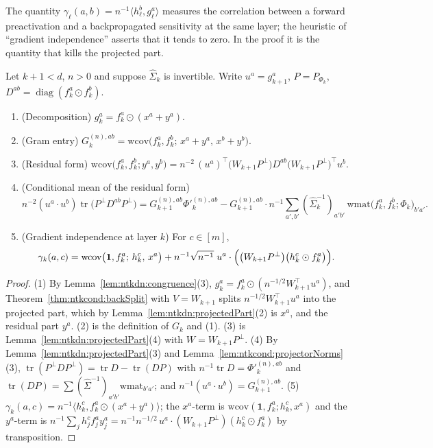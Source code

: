 The quantity $\gamma_\ell(a,b)=n^{-1}\langle h_\ell^b,g_\ell^a\rangle$ measures the correlation between a forward preactivation and a backpropagated sensitivity at the same layer; the heuristic of ``gradient independence'' asserts that it tends to zero. In the proof it is the quantity that kills the projected part.

\begin{lemma}\label{lem:ntkdn:hiddenDecomp}
  \leanok
Let $k+1<d$, $n>0$ and suppose $\hat\Sigma_k$ is invertible. Write $u^a=g_{k+1}^a$, $P=P_{\Phi_k}$, $D^{ab}=\operatorname{diag}(f_k^a\odot f_k^b)$.
\begin{enumerate}
  \item (Decomposition) $g_k^a=f_k^a\odot(x^a+y^a)$.
  \item (Gram entry) $G_k^{(n),ab}=\mathrm{wcov}\bigl(f_k^a,f_k^b;\,x^a+y^a,\,x^b+y^b\bigr)$.
  \item (Residual form) $\mathrm{wcov}\bigl(f_k^a,f_k^b;y^a,y^b\bigr)=n^{-2}\,(u^a)^\top\bigl(W_{k+1}P^\perp\bigr)D^{ab}\bigl(W_{k+1}P^\perp\bigr)^\top u^b$.
  \item (Conditional mean of the residual form)
  \[
    n^{-2}(u^a\cdot u^b)\operatorname{tr}\bigl(P^\perp D^{ab}P^\perp\bigr)=G_{k+1}^{(n),ab}\Phi'^{(n),ab}_k-G_{k+1}^{(n),ab}\cdot n^{-1}\sum_{a',b'}(\hat\Sigma_k^{-1})_{a'b'}\,\mathrm{wmat}\bigl(f_k^a,f_k^b;\Phi_k\bigr)_{b'a'} .
  \]
  \item (Gradient independence at layer $k$) For $c\in[m]$,
  \[
    \gamma_k(a,c)=\mathrm{wcov}\bigl(\mathbf 1,f_k^a;\,h_k^c,\,x^a\bigr)+n^{-1}\sqrt{n^{-1}}\;u^a\cdot\Bigl(\bigl(W_{k+1}P^\perp\bigr)\bigl(h_k^c\odot f_k^a\bigr)\Bigr).
  \]
\end{enumerate}
\end{lemma}

\begin{proof}
  \leanok
(1) By Lemma~\ref{lem:ntkdn:congruence}(3), $g_k^a=f_k^a\odot(n^{-1/2}W_{k+1}^\top u^a)$, and Theorem~\ref{thm:ntkcond:backSplit} with $V=W_{k+1}$ splits $n^{-1/2}W_{k+1}^\top u^a$ into the projected part, which by Lemma~\ref{lem:ntkdn:projectedPart}(2) is $x^a$, and the residual part $y^a$. (2) is the definition of $G_k$ and (1). (3) is Lemma~\ref{lem:ntkdn:projectedPart}(4) with $W=W_{k+1}P^\perp$. (4) By Lemma~\ref{lem:ntkdn:projectedPart}(3) and Lemma~\ref{lem:ntkcond:projectorNorms}(3), $\operatorname{tr}(P^\perp DP^\perp)=\operatorname{tr}D-\operatorname{tr}(DP)$ with $n^{-1}\operatorname{tr}D=\Phi'^{(n),ab}_k$ and $\operatorname{tr}(DP)=\sum(\hat\Sigma^{-1})_{a'b'}\mathrm{wmat}_{b'a'}$; and $n^{-1}(u^a\cdot u^b)=G_{k+1}^{(n),ab}$. (5) $\gamma_k(a,c)=n^{-1}\langle h_k^c,f_k^a\odot(x^a+y^a)\rangle$; the $x^a$-term is $\mathrm{wcov}(\mathbf 1,f_k^a;h_k^c,x^a)$ and the $y^a$-term is $n^{-1}\sum_jh^c_jf^a_jy^a_j=n^{-1}n^{-1/2}\,u^a\cdot(W_{k+1}P^\perp)(h^c_k\odot f^a_k)$ by transposition.
\end{proof}

